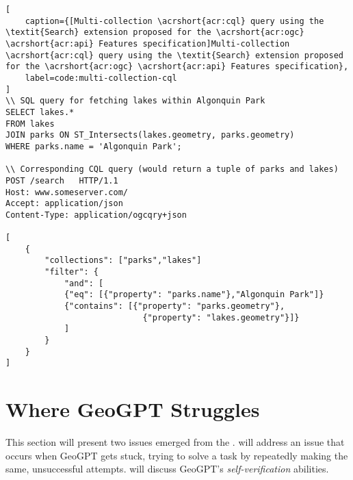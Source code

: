 \begin{lstlisting}[
    caption={[Multi-collection \acrshort{acr:cql} query using the \textit{Search} extension proposed for the \acrshort{acr:ogc} \acrshort{acr:api} Features specification]Multi-collection \acrshort{acr:cql} query using the \textit{Search} extension proposed for the \acrshort{acr:ogc} \acrshort{acr:api} Features specification},
    label=code:multi-collection-cql
]
\\ SQL query for fetching lakes within Algonquin Park
SELECT lakes.*
FROM lakes
JOIN parks ON ST_Intersects(lakes.geometry, parks.geometry)
WHERE parks.name = 'Algonquin Park';

\\ Corresponding CQL query (would return a tuple of parks and lakes)
POST /search   HTTP/1.1                                           
Host: www.someserver.com/                                         
Accept: application/json                                          
Content-Type: application/ogcqry+json                             
                                                                    
[                                                                 
    {                                                              
        "collections": ["parks","lakes"]                            
        "filter": {                                                 
            "and": [                                                 
            {"eq": [{"property": "parks.name"},"Algonquin Park"]} 
            {"contains": [{"property": "parks.geometry"},         
                            {"property": "lakes.geometry"}]}        
            ]                                                        
        }                                                           
    }                                                              
]
\end{lstlisting}


\section[Where GeoGPT Struggles]{Where GeoGPT Struggles}
\label{sec:autonomous-gis-struggles}

This section will present two issues emerged from the .  will address an issue that occurs when GeoGPT gets stuck, trying to solve a task by repeatedly making the same, unsuccessful attempts.  will discuss GeoGPT's \textit{self-verification} abilities.

